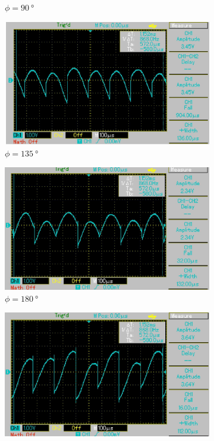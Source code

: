 \begin{figure}[H]
\begin{subfigure}{0.3\textwidth}
    \caption{$\phi = \SI{90}{\degree}$}
  \end{subfigure}
  \begin{subfigure}{0.3\textwidth}
    \centering
    \includegraphics[width=\textwidth]{build/135.jpg}
    \caption{$\phi = \SI{135}{\degree}$}
  \end{subfigure}
  \begin{subfigure}{0.3\textwidth}
    \centering
    \includegraphics[width=\textwidth]{build/180.jpg}
    \caption{$\phi = \SI{180}{\degree}$}
  \end{subfigure}
  \begin{subfigure}{0.3\textwidth}
    \centering
    \includegraphics[width=\textwidth]{build/225.jpg}

\end{subfigure}
\end{figure}
